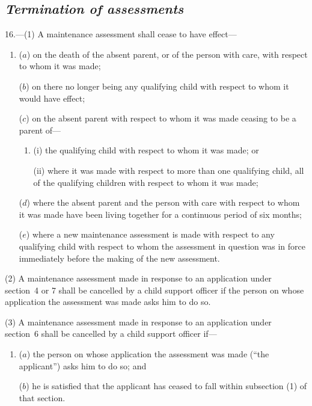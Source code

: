 \documentclass[12pt,a4paper]{article}
\begin{document}

\subsection*{\itshape Termination of assessments}

16.---(1) A maintenance assessment shall cease to have effect—
\begin{enumerate}\item[]
($a$) on the death of the absent parent, or of the person with care, with respect to whom it was made;

($b$) on there no longer being any qualifying child with respect to whom it would have effect;

($c$) on the absent parent with respect to whom it was made ceasing to be a parent of—
\begin{enumerate}\item[]
(i) the qualifying child with respect to whom it was made; or

(ii) where it was made with respect to more than one qualifying child, all of the qualifying children with respect to whom it was made;
\end{enumerate}

($d$) where the absent parent and the person with care with respect to whom it was made have been living together for a continuous period of six months;

($e$) where a new maintenance assessment is made with respect to any qualifying child with respect to whom the assessment in question was in force immediately before the making of the new assessment.
\end{enumerate}

(2) A maintenance assessment made in response to an application under section~4 or 7 shall be cancelled by a child support officer if the person on whose application the assessment was made asks him to do so.

(3) A maintenance assessment made in response to an application under section~6 shall be cancelled by a child support officer if—
\begin{enumerate}\item[]
($a$) the person on whose application the assessment was made (“the applicant”) asks him to do so; and

($b$) he is satisfied that the applicant has ceased to fall within subsection (1)  of that section.
\end{enumerate}
\end{document}
